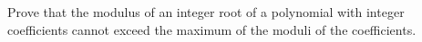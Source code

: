 Prove that the modulus of an integer root of a polynomial with integer coefficients cannot exceed the maximum of the moduli of the coefficients.